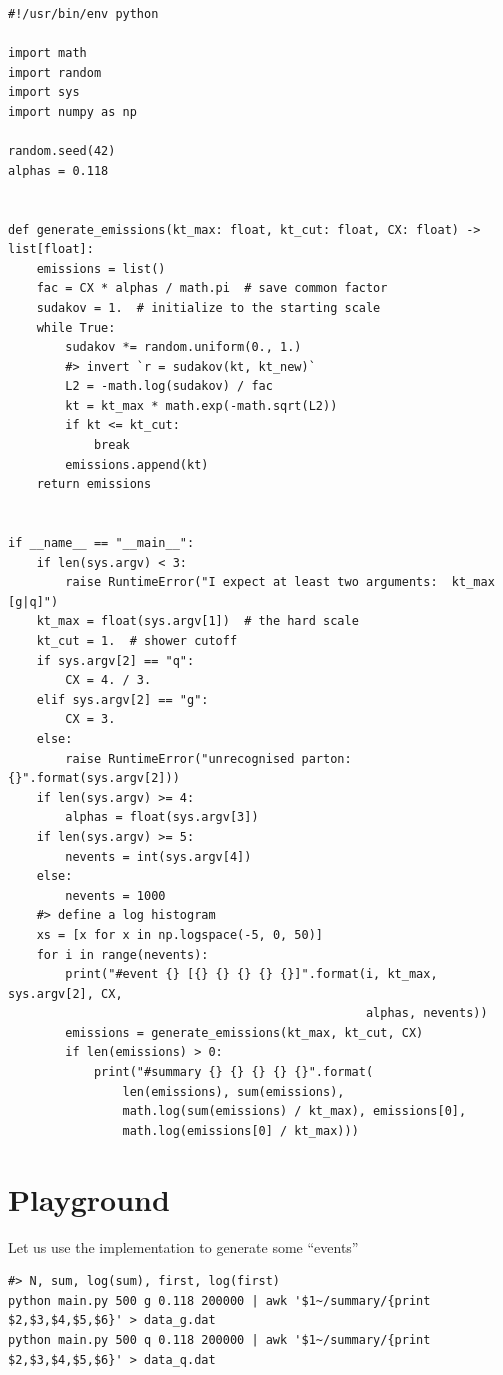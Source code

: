 \documentclass[11pt]{article}
\begin{document}
\begin{verbatim}
#!/usr/bin/env python

import math
import random
import sys
import numpy as np

random.seed(42)
alphas = 0.118


def generate_emissions(kt_max: float, kt_cut: float, CX: float) -> list[float]:
    emissions = list()
    fac = CX * alphas / math.pi  # save common factor
    sudakov = 1.  # initialize to the starting scale
    while True:
        sudakov *= random.uniform(0., 1.)
        #> invert `r = sudakov(kt, kt_new)`
        L2 = -math.log(sudakov) / fac
        kt = kt_max * math.exp(-math.sqrt(L2))
        if kt <= kt_cut:
            break
        emissions.append(kt)
    return emissions


if __name__ == "__main__":
    if len(sys.argv) < 3:
        raise RuntimeError("I expect at least two arguments:  kt_max [g|q]")
    kt_max = float(sys.argv[1])  # the hard scale
    kt_cut = 1.  # shower cutoff
    if sys.argv[2] == "q":
        CX = 4. / 3.
    elif sys.argv[2] == "g":
        CX = 3.
    else:
        raise RuntimeError("unrecognised parton: {}".format(sys.argv[2]))
    if len(sys.argv) >= 4:
        alphas = float(sys.argv[3])
    if len(sys.argv) >= 5:
        nevents = int(sys.argv[4])
    else:
        nevents = 1000
    #> define a log histogram
    xs = [x for x in np.logspace(-5, 0, 50)]
    for i in range(nevents):
        print("#event {} [{} {} {} {} {}]".format(i, kt_max, sys.argv[2], CX,
                                                  alphas, nevents))
        emissions = generate_emissions(kt_max, kt_cut, CX)
        if len(emissions) > 0:
            print("#summary {} {} {} {} {}".format(
                len(emissions), sum(emissions),
                math.log(sum(emissions) / kt_max), emissions[0],
                math.log(emissions[0] / kt_max)))
\end{verbatim}

\section{Playground}
\label{sec:orgcce2259}
Let us use the implementation to generate some ``events''
\begin{verbatim}
#> N, sum, log(sum), first, log(first)
python main.py 500 g 0.118 200000 | awk '$1~/summary/{print $2,$3,$4,$5,$6}' > data_g.dat
python main.py 500 q 0.118 200000 | awk '$1~/summary/{print $2,$3,$4,$5,$6}' > data_q.dat
\end{verbatim}
\end{document}
